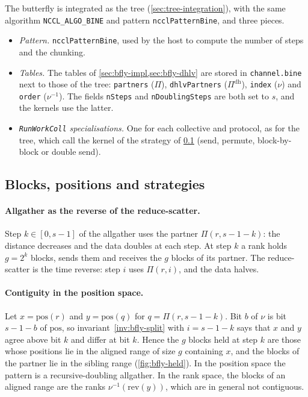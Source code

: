 The butterfly is integrated as the tree (\cref{sec:tree-integration}), with the same algorithm \texttt{NCCL\_ALGO\_BINE} and pattern \texttt{ncclPatternBine}, and three pieces.
\begin{itemize}
  \item \emph{Pattern.} \texttt{ncclPatternBine}, used by the host to compute the number of steps and the chunking.
  \item \emph{Tables.} The tables of \cref{sec:bfly-impl,sec:bfly-dhlv} are stored in \texttt{channel.bine} next to those of the tree: \texttt{partners} ($\Pi$), \texttt{dhlvPartners} ($\Pi^{\mathrm{dh}}$), \texttt{index} ($\nu$) and \texttt{order} ($\nu^{-1}$).
  The fields \texttt{nSteps} and \texttt{nDoublingSteps} are both set to $s$, and the kernels use the latter.
  \item \emph{\texttt{RunWorkColl} specialisations.} One for each collective and protocol, as for the tree, which call the kernel of the strategy of \cref{sec:bfly-strategies} (send, permute, block-by-block or double send).
\end{itemize}

\subsection{Blocks, positions and strategies}\label{sec:bfly-strategies}

\paragraph{Allgather as the reverse of the reduce-scatter.}
Step $k\in[0,s-1]$ of the allgather uses the partner $\Pi(r,s-1-k)$: the distance decreases and the data doubles at each step.
At step $k$ a rank holds $g=2^k$ blocks, sends them and receives the $g$ blocks of its partner.
The reduce-scatter is the time reverse: step $i$ uses $\Pi(r,i)$, and the data halves.

\paragraph{Contiguity in the position space.}
Let $x=\mathrm{pos}(r)$ and $y=\mathrm{pos}(q)$ for $q=\Pi(r,s-1-k)$.
Bit $b$ of $\nu$ is bit $s-1-b$ of $\mathrm{pos}$, so invariant~\ref{inv:bfly-split} with $i=s-1-k$ says that $x$ and $y$ agree above bit $k$ and differ at bit $k$.
Hence the $g$ blocks held at step $k$ are those whose positions lie in the aligned range of size $g$ containing $x$, and the blocks of the partner lie in the sibling range (\cref{fig:bfly-held}).
In the position space the pattern is a recursive-doubling allgather. In the rank space, the blocks of an aligned range are the ranks $\nu^{-1}(\mathrm{rev}(y))$, which are in general not contiguous.


